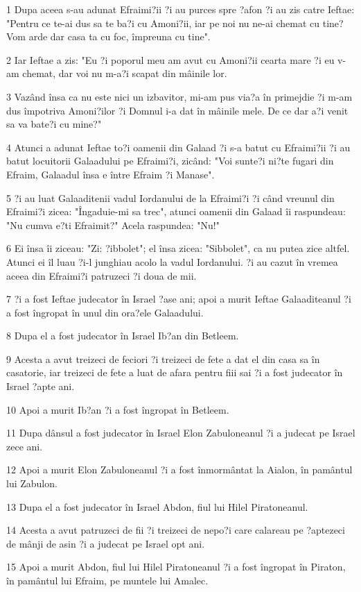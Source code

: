 \par 1 Dupa aceea s-au adunat Efraimi?ii ?i au purces spre ?afon ?i au zis catre Ieftae: "Pentru ce te-ai dus sa te ba?i cu Amoni?ii, iar pe noi nu ne-ai chemat cu tine? Vom arde dar casa ta cu foc, împreuna cu tine".
\par 2 Iar Ieftae a zis: "Eu ?i poporul meu am avut cu Amoni?ii cearta mare ?i eu v-am chemat, dar voi nu m-a?i scapat din mâinile lor.
\par 3 Vazând însa ca nu este nici un izbavitor, mi-am pus via?a în primejdie ?i m-am dus împotriva Amoni?ilor ?i Domnul i-a dat în mâinile mele. De ce dar a?i venit sa va bate?i cu mine?"
\par 4 Atunci a adunat Ieftae to?i oamenii din Galaad ?i s-a batut cu Efraimi?ii ?i au batut locuitorii Galaadului pe Efraimi?i, zicând: "Voi sunte?i ni?te fugari din Efraim, Galaadul însa e între Efraim ?i Manase".
\par 5 ?i au luat Galaaditenii vadul Iordanului de la Efraimi?i ?i când vreunul din Efraimi?i zicea: "Îngaduie-mi sa trec", atunci oamenii din Galaad îi raspundeau: "Nu cumva e?ti Efraimit?" Acela raspundea: "Nu!"
\par 6 Ei însa îi ziceau: "Zi: ?ibbolet"; el însa zicea: "Sibbolet", ca nu putea zice altfel. Atunci ei îl luau ?i-l junghiau acolo la vadul Iordanului. ?i au cazut în vremea aceea din Efraimi?i patruzeci ?i doua de mii.
\par 7 ?i a fost Ieftae judecator în Israel ?ase ani; apoi a murit Ieftae Galaaditeanul ?i a fost îngropat în unul din ora?ele Galaadului.
\par 8 Dupa el a fost judecator în Israel Ib?an din Betleem.
\par 9 Acesta a avut treizeci de feciori ?i treizeci de fete a dat el din casa sa în casatorie, iar treizeci de fete a luat de afara pentru fiii sai ?i a fost judecator în Israel ?apte ani.
\par 10 Apoi a murit Ib?an ?i a fost îngropat în Betleem.
\par 11 Dupa dânsul a fost judecator în Israel Elon Zabuloneanul ?i a judecat pe Israel zece ani.
\par 12 Apoi a murit Elon Zabuloneanul ?i a fost înmormântat la Aialon, în pamântul lui Zabulon.
\par 13 Dupa el a fost judecator în Israel Abdon, fiul lui Hilel Piratoneanul.
\par 14 Acesta a avut patruzeci de fii ?i treizeci de nepo?i care calareau pe ?aptezeci de mânji de asin ?i a judecat pe Israel opt ani.
\par 15 Apoi a murit Abdon, fiul lui Hilel Piratoneanul ?i a fost îngropat în Piraton, în pamântul lui Efraim, pe muntele lui Amalec.

